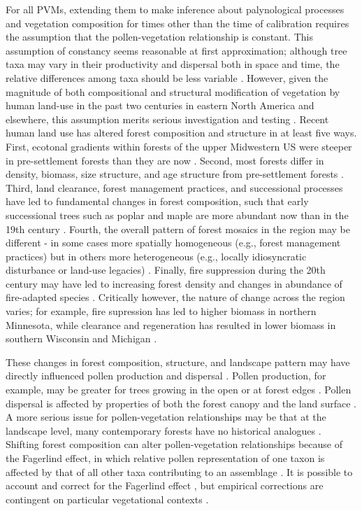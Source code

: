 \documentclass[12pt]{article}
\begin{document}
For all PVMs, extending them to make inference about palynological
processes and vegetation composition for times other than the time of
calibration requires the assumption that the pollen-vegetation
relationship is constant. This assumption of constancy seems
reasonable at first approximation; although tree taxa may vary in
their productivity and dispersal both in space and time, the relative
differences among taxa should be less variable
\citep{parsons1981statistical}.  However, given the magnitude of both
compositional and structural modification of vegetation by human
land-use in the past two centuries in eastern North America and
elsewhere, this assumption merits serious investigation and testing
\citep{kujawa2015}. Recent human land use has altered forest
composition and structure in at least five ways.  First, ecotonal
gradients within forests of the upper Midwestern US were steeper
in pre-settlement forests than they are now
\citep{goring_witness}. Second, most forests differ in density,
biomass, size structure, and age structure from pre-settlement forests
\citep{leahy2003comparison, schulte2007homogenization,
  rhemtulla2009legacies, goring_witness}.  Third, land clearance,
forest management practices, and successional processes have led to
fundamental changes in forest composition, such that early
successional trees such as poplar and maple are more abundant now than
in the 19th century \citep{thompson2013four, goring_witness}.  Fourth,
the overall pattern of forest mosaics in the region may be different -
in some cases more spatially homogeneous (e.g., forest management
practices) but in others more heterogeneous (e.g., locally
idiosyncratic disturbance or land-use legacies)
\citep{thompson2013four, wang2007spatial, li2015drivers}. Finally,
fire suppression during the 20th century may have led to increasing
forest density and changes in abundance of fire-adapted species
\citep{nowacki2008demise}. Critically however, the nature of change
across the region varies; for example, fire supression has led to
higher biomass in northern Minnesota, while clearance and regeneration
has resulted in lower biomass in southern Wisconsin and Michigan
\citep{goring_witness}.

These changes in forest composition, structure, and landscape pattern
may have directly influenced pollen production and dispersal
\citep{kujawa2015}.  Pollen production, for example, may be greater
for trees growing in the open or at forest edges
\citep{feldman1999cost}.  Pollen dispersal is affected by properties
of both the forest canopy and the land surface
\citep{jackson1999pollen}.  A more serious issue for pollen-vegetation
relationships may be that at the landscape level, many contemporary
forests have no historical analogues \citep{goring_witness}. Shifting
forest composition can alter pollen-vegetation relationships because
of the Fagerlind effect, in which relative pollen representation of
one taxon is affected by that of all other taxa contributing to an
assemblage \citep{prentice1988records}. It is possible to account and
correct for the Fagerlind effect \citep{prentice1986,
  jackson1995exploration}, but empirical corrections are contingent on
particular vegetational contexts \citep{jackson1998quantitative}.
\end{document}
